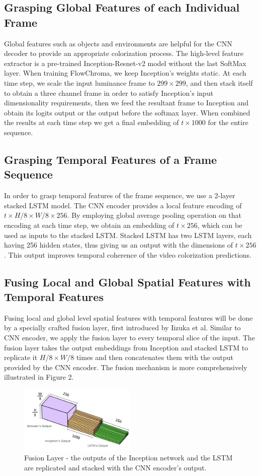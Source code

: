 \documentclass[10pt,twocolumn,letterpaper]{article}
\begin{document}
\subsection{Grasping Global Features of each Individual Frame}
Global features such as objects and environments are helpful for the CNN decoder to provide an appropriate colorization process. The high-level feature extractor is a pre-trained Inception-Resnet-v2 model without the last SoftMax layer. When training FlowChroma, we keep Inception's weights static. At each time step, we scale the input luminance frame to $299\times 299$, and then stack itself to obtain a three channel frame in order to satisfy Inception's input dimensionality requirements, then we feed the resultant frame to Inception and obtain its logits output or the output before the softmax layer. When combined the results at each time step we get a final embedding of $t\times 1000$ for the entire sequence.


\subsection{Grasping Temporal Features of a Frame Sequence}
In order to grasp temporal features of the frame sequence, we use a 2-layer stacked LSTM model. The CNN encoder provides a local feature encoding of  $t\times H/8\times W/8\times 256$. By employing global average pooling operation on that encoding at each time step, we obtain an embedding of $t\times 256$, which can be used as inputs to the stacked LSTM. Stacked LSTM has two LSTM layers, each having 256 hidden states, thus giving us an output with the dimensions of $t\times 256$. This output improves temporal coherence of the video colorization predictions.

\subsection{Fusing Local and Global Spatial Features with Temporal Features}
Fusing local and global level spatial features with temporal features will be done by a specially crafted fusion layer, first introduced by Iizuka et al. Similar to CNN encoder, we apply the fusion layer to every temporal slice of the input. The fusion layer takes the output embeddings from Inception and stacked LSTM to replicate it $H/8\times W/8$ times and then concatenates them with the output provided by the CNN encoder. The fusion mechanism is more comprehensively illustrated in Figure 2.

\begin{figure}[!h]
  \centering
  \includegraphics[width=0.5\textwidth]{fusion-layer.png}
  \caption{Fusion Layer - the outputs of the Inception network and the LSTM are replicated and stacked with the CNN encoder's output.}
\end{figure}
\end{document}
